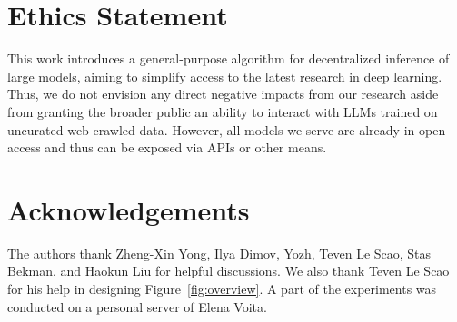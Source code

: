 \documentclass[11pt]{article}
\begin{document}
\section*{Ethics Statement}
This work introduces a general-purpose algorithm for decentralized inference of large models, aiming to simplify access to the latest research in deep learning. Thus, we do not envision any direct negative impacts from our research aside from granting the broader public an ability to interact with LLMs trained on uncurated web-crawled data. However, all models we serve are already in open access and thus can be exposed via APIs or other means.

\section*{Acknowledgements}

The authors thank Zheng-Xin Yong, Ilya Dimov, Yozh, Teven Le Scao, Stas Bekman, and Haokun Liu for helpful discussions. We also thank Teven Le Scao for his help in designing Figure~\ref{fig:overview}. A part of the experiments was conducted on a personal server of Elena Voita.

\clearpage



\end{document}

